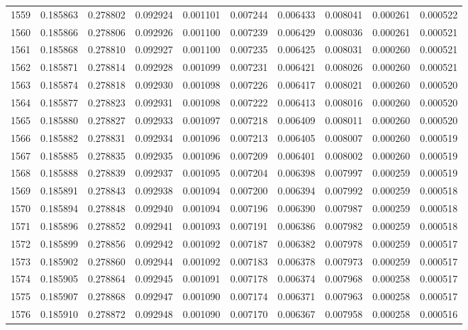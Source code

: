 \begin{tabular}{lrrrrrrrrr}
1559 & 0.185863 & 0.278802 & 0.092924 & 0.001101 & 0.007244 & 0.006433 & 0.008041 & 0.000261 & 0.000522 \\
1560 & 0.185866 & 0.278806 & 0.092926 & 0.001100 & 0.007239 & 0.006429 & 0.008036 & 0.000261 & 0.000521 \\
1561 & 0.185868 & 0.278810 & 0.092927 & 0.001100 & 0.007235 & 0.006425 & 0.008031 & 0.000260 & 0.000521 \\
1562 & 0.185871 & 0.278814 & 0.092928 & 0.001099 & 0.007231 & 0.006421 & 0.008026 & 0.000260 & 0.000521 \\
1563 & 0.185874 & 0.278818 & 0.092930 & 0.001098 & 0.007226 & 0.006417 & 0.008021 & 0.000260 & 0.000520 \\
1564 & 0.185877 & 0.278823 & 0.092931 & 0.001098 & 0.007222 & 0.006413 & 0.008016 & 0.000260 & 0.000520 \\
1565 & 0.185880 & 0.278827 & 0.092933 & 0.001097 & 0.007218 & 0.006409 & 0.008011 & 0.000260 & 0.000520 \\
1566 & 0.185882 & 0.278831 & 0.092934 & 0.001096 & 0.007213 & 0.006405 & 0.008007 & 0.000260 & 0.000519 \\
1567 & 0.185885 & 0.278835 & 0.092935 & 0.001096 & 0.007209 & 0.006401 & 0.008002 & 0.000260 & 0.000519 \\
1568 & 0.185888 & 0.278839 & 0.092937 & 0.001095 & 0.007204 & 0.006398 & 0.007997 & 0.000259 & 0.000519 \\
1569 & 0.185891 & 0.278843 & 0.092938 & 0.001094 & 0.007200 & 0.006394 & 0.007992 & 0.000259 & 0.000518 \\
1570 & 0.185894 & 0.278848 & 0.092940 & 0.001094 & 0.007196 & 0.006390 & 0.007987 & 0.000259 & 0.000518 \\
1571 & 0.185896 & 0.278852 & 0.092941 & 0.001093 & 0.007191 & 0.006386 & 0.007982 & 0.000259 & 0.000518 \\
1572 & 0.185899 & 0.278856 & 0.092942 & 0.001092 & 0.007187 & 0.006382 & 0.007978 & 0.000259 & 0.000517 \\
1573 & 0.185902 & 0.278860 & 0.092944 & 0.001092 & 0.007183 & 0.006378 & 0.007973 & 0.000259 & 0.000517 \\
1574 & 0.185905 & 0.278864 & 0.092945 & 0.001091 & 0.007178 & 0.006374 & 0.007968 & 0.000258 & 0.000517 \\
1575 & 0.185907 & 0.278868 & 0.092947 & 0.001090 & 0.007174 & 0.006371 & 0.007963 & 0.000258 & 0.000517 \\
1576 & 0.185910 & 0.278872 & 0.092948 & 0.001090 & 0.007170 & 0.006367 & 0.007958 & 0.000258 & 0.000516 \\

\end{tabular}
